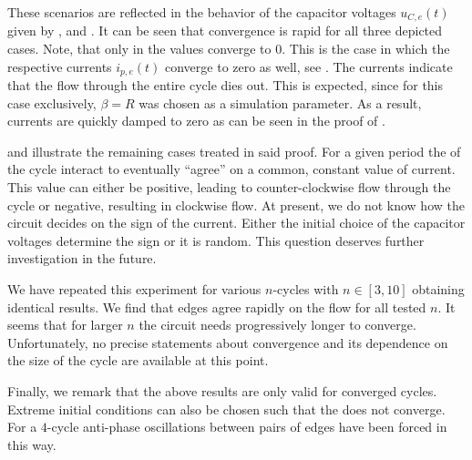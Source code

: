 		These scenarios are reflected in the behavior of the capacitor voltages $u_{C,e}(t)$ given by ,  and . It can be seen that convergence is rapid for all three depicted cases. Note, that only in  the values converge to $0$. This is the case in which the respective currents $i_{p,e}(t)$ converge to zero as well, see . The currents indicate that the flow through the entire cycle dies out. This is expected, since for this case exclusively, $\beta = R$ was chosen as a simulation parameter. As a result, currents are quickly damped to zero as can be seen in the proof of .

		 and  illustrate the remaining cases treated in said proof. For a given period the \Pes of the cycle interact to eventually ``agree'' on a common, constant value of current. This value can either be positive, leading to counter-clockwise flow through the cycle or negative, resulting in clockwise flow. At present, we do not know how the circuit decides on the sign of the current. Either the initial choice of the capacitor voltages determine the sign or it is random. This question deserves further investigation in the future.

		We have repeated this experiment for various $n$-cycles with $n \in [3,10]$ obtaining identical results. We find that edges agree rapidly on the flow for all tested $n$. It seems that for larger $n$ the circuit needs progressively longer to converge. Unfortunately, no precise statements about convergence and its dependence on the size of the cycle are available at this point.

		Finally, we remark that the above results are only valid for converged cycles. Extreme initial conditions can also be chosen such that the \Pn does not converge. For a $4$-cycle anti-phase oscillations between pairs of edges have been forced in this way.  

